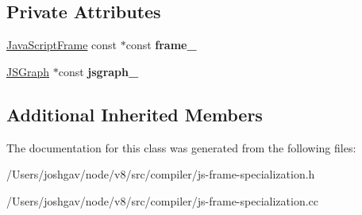 \subsection*{Private Attributes}
\begin{DoxyCompactItemize}
\item 
\hyperlink{classv8_1_1internal_1_1_java_script_frame}{Java\+Script\+Frame} const $\ast$const {\bfseries frame\+\_\+}\hypertarget{classv8_1_1internal_1_1compiler_1_1_j_s_frame_specialization_a5bb1f08641729dca5eab65332e918c4c}{}\label{classv8_1_1internal_1_1compiler_1_1_j_s_frame_specialization_a5bb1f08641729dca5eab65332e918c4c}

\item 
\hyperlink{classv8_1_1internal_1_1compiler_1_1_j_s_graph}{J\+S\+Graph} $\ast$const {\bfseries jsgraph\+\_\+}\hypertarget{classv8_1_1internal_1_1compiler_1_1_j_s_frame_specialization_a9246a7551df08db250fbd5b955aab149}{}\label{classv8_1_1internal_1_1compiler_1_1_j_s_frame_specialization_a9246a7551df08db250fbd5b955aab149}

\end{DoxyCompactItemize}
\subsection*{Additional Inherited Members}


The documentation for this class was generated from the following files\+:\begin{DoxyCompactItemize}
\item 
/\+Users/joshgav/node/v8/src/compiler/js-\/frame-\/specialization.\+h\item 
/\+Users/joshgav/node/v8/src/compiler/js-\/frame-\/specialization.\+cc\end{DoxyCompactItemize}
